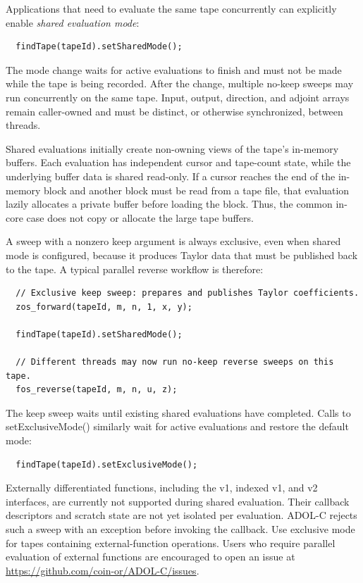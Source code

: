 \documentclass[11pt,twoside]{article}
\begin{document}
Applications that need to evaluate the same tape concurrently can explicitly
enable \emph{shared evaluation mode}:
\begin{verbatim}
  findTape(tapeId).setSharedMode();
\end{verbatim}
The mode change waits for active evaluations to finish and must not be made
while the tape is being recorded. After the change, multiple no-keep sweeps may
run concurrently on the same tape. Input, output, direction, and adjoint arrays
remain caller-owned and must be distinct, or otherwise synchronized, between
threads.

Shared evaluations initially create non-owning views of the tape's in-memory
buffers. Each evaluation has independent cursor and tape-count state, while
the underlying buffer data is shared read-only. If a cursor reaches the end of 
the in-memory block and another block must be read from a tape file, that
evaluation lazily allocates a private buffer before loading the block. Thus,
the common in-core case does not copy or allocate the large tape buffers.

A sweep with a nonzero {\sf keep} argument is always exclusive, even when
shared mode is configured, because it produces Taylor data that must be
published back to the tape. A typical parallel reverse workflow is therefore:
\begin{verbatim}
  // Exclusive keep sweep: prepares and publishes Taylor coefficients.
  zos_forward(tapeId, m, n, 1, x, y);

  findTape(tapeId).setSharedMode();

  // Different threads may now run no-keep reverse sweeps on this tape.
  fos_reverse(tapeId, m, n, u, z);
\end{verbatim}
The keep sweep waits until existing shared evaluations have completed. Calls
to {\sf setExclusiveMode()} similarly wait for active evaluations and restore
the default mode:
\begin{verbatim}
  findTape(tapeId).setExclusiveMode();
\end{verbatim}

Externally differentiated functions, including the v1, indexed v1, and v2
interfaces, are currently not supported during shared evaluation. Their
callback descriptors and scratch state are not yet isolated per evaluation.
ADOL-C rejects such a sweep with an exception before invoking the callback.
Use exclusive mode for tapes containing external-function operations. Users
who require parallel evaluation of external functions are encouraged to open
an issue at \url{https://github.com/coin-or/ADOL-C/issues}.
\end{document}
